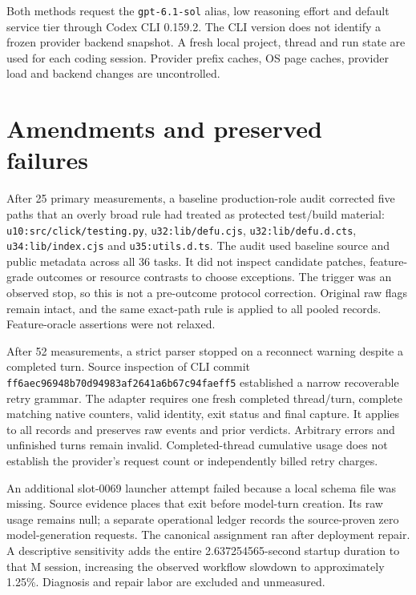 \documentclass[manuscript,screen,nonacm]{acmart}
\begin{document}
Both methods request the \texttt{gpt-6.1-sol} alias, low reasoning
effort and default service tier through Codex CLI 0.159.2. The CLI
version does not identify a frozen provider backend snapshot. A fresh
local project, thread and run state are used for each coding session.
Provider prefix caches, OS page caches, provider load and backend
changes are uncontrolled.

\section{Amendments and preserved
failures}\label{amendments-and-preserved-failures}

After 25 primary measurements, a baseline production-role audit
corrected five paths that an overly broad rule had treated as protected
test/build material: \nolinkurl{u10:src/click/testing.py},
\texttt{u32:lib/defu.cjs}, \nolinkurl{u32:lib/defu.d.cts},
\texttt{u34:lib/index.cjs} and \texttt{u35:utils.d.ts}. The audit used
baseline source and public metadata across all 36 tasks. It did not
inspect candidate patches, feature-grade outcomes or resource contrasts
to choose exceptions. The trigger was an observed stop, so this is not a
pre-outcome protocol correction. Original raw flags remain intact, and
the same exact-path rule is applied to all pooled records.
Feature-oracle assertions were not relaxed.

After 52 measurements, a strict parser stopped on a reconnect warning
despite a completed turn. Source inspection of CLI commit
\nolinkurl{ff6aec96948b70d94983af2641a6b67c94faeff5} established a
narrow recoverable retry grammar. The adapter requires one fresh
completed thread/turn, complete matching native counters, valid
identity, exit status and final capture. It applies to all records and
preserves raw events and prior verdicts. Arbitrary errors and unfinished
turns remain invalid. Completed-thread cumulative usage does not
establish the provider's request count or independently billed retry
charges.

An additional slot-0069 launcher attempt failed because a local schema
file was missing. Source evidence places that exit before model-turn
creation. Its raw usage remains null; a separate operational ledger
records the source-proven zero model-generation requests. The canonical
assignment ran after deployment repair. A descriptive sensitivity adds
the entire 2.637254565-second startup duration to that M session,
increasing the observed workflow slowdown to approximately 1.25\%.
Diagnosis and repair labor are excluded and unmeasured.
\end{document}
